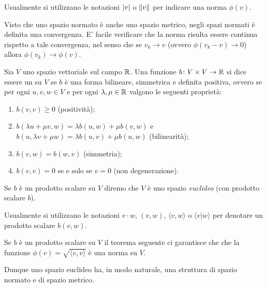 Usualmente si utilizzano le notazioni ${\left|v\right|}$ o ${\left\Vert v\right\Vert}$ per indicare
una norma $\phi(v)$.

Visto che uno spazio normato è anche uno spazio metrico, negli spazi
normati è definita una convergenza. E' facile verificare che la norma risulta
essere continua rispetto a tale convergenza, nel senso che se $v_k \to v$
(ovvero $\phi(v_k-v)\to 0$) allora $\phi(v_k)\to \phi(v)$.

\begin{definition}
\label{def:prodotto_scalare}
Sia $V$ uno spazio vettoriale sul campo $\mathbb R$.
Una funzione $b\colon V\times V \to \mathbb R$ si dice
essere un  su $V$ se
$b$ è una forma bilineare, simmetrica e definita
positiva, ovvero se
per ogni $u,v,w\in V$ e per ogni $\lambda, \mu \in \mathbb R$
valgono le seguenti proprietà:
\begin{enumerate}
\item $b(v,v) \ge 0$ (positività);
\item $b(\lambda u + \mu v, w) = \lambda b(u,w) + \mu b(v,w)$
e $b(u,\lambda v+ \mu w) = \lambda b(u,v) + \mu b(u,w)$
(bilinearità);
\item $b(v,w) = b(w,v)$ (simmetria);
\item $b(v,v) = 0$ se e solo se $v=0$ (non degenerazione).
\end{enumerate}

Se $b$ è un prodotto scalare su $V$ diremo che $V$ è uno
spazio \emph{euclideo} (con prodotto scalare $b$).

Usualmente si utilizzano le notazioni $v\cdot w$, $(v,w)$, $\langle v,w\rangle$
o $\langle v \vert w\rangle$ per denotare un prodotto scalare $b(v,w)$.
\end{definition}

Se $b$ è un prodotto scalare su $V$ il teorema seguente ci garantisce che
che la funzione $\phi(v) = \sqrt{\langle v,v\rangle}$ è una norma su $V$.

Dunque uno spazio euclideo ha, in modo naturale, una struttura di spazio
normato e di spazio metrico.

